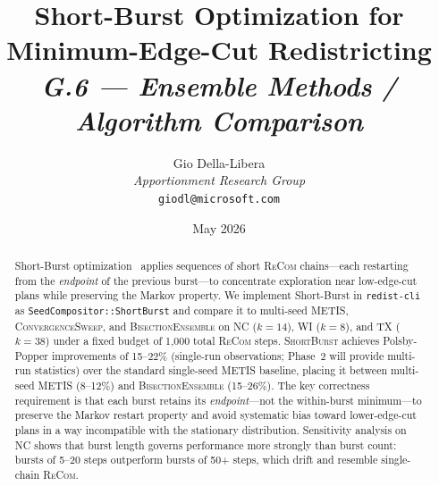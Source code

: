 \documentclass[12pt]{article}
\title{%
  \textbf{Short-Burst Optimization for Minimum-Edge-Cut Redistricting}\\[0.8em]
  \normalsize\textit{G.6 --- Ensemble Methods / Algorithm Comparison}%
}
\author{%
  Gio Della-Libera\\
  \textit{Apportionment Research Group}\\
  \small\texttt{giodl@microsoft.com}
}
\date{May 2026}
\newcommand{\recom}{\textsc{ReCom}}
\newcommand{\shb}{\textsc{ShortBurst}}
\newcommand{\be}{\textsc{BisectionEnsemble}}
\newcommand{\cs}{\textsc{ConvergenceSweep}}
\begin{document}
\maketitle

\begin{abstract}
\noindent
Short-Burst optimization~\citep{cannon2022} applies sequences of short
\recom{} chains---each restarting from the \emph{endpoint} of the
previous burst---to concentrate exploration near low-edge-cut plans
while preserving the Markov property.
We implement Short-Burst in \texttt{redist-cli} as
\texttt{SeedCompositor::ShortBurst} and compare it to multi-seed METIS,
\cs{}, and \be{} on NC ($k=14$), WI ($k=8$), and TX ($k=38$)
under a fixed budget of 1{,}000 total \recom{} steps.
\shb{} achieves Polsby-Popper improvements of 15--22\%
(single-run observations; Phase~2 will provide multi-run statistics)
over the standard single-seed METIS baseline, placing it between
multi-seed METIS (8--12\%) and \be{} (15--26\%).
The key correctness requirement is that each burst retains its
\emph{endpoint}---not the within-burst minimum---to preserve the
Markov restart property and avoid systematic bias toward lower-edge-cut
plans in a way incompatible with the stationary distribution.
Sensitivity analysis on NC shows that burst length governs performance
more strongly than burst count: bursts of 5--20 steps outperform
bursts of 50+ steps, which drift and resemble single-chain \recom{}.
\end{abstract}

\tableofcontents
\newpage










\end{document}

